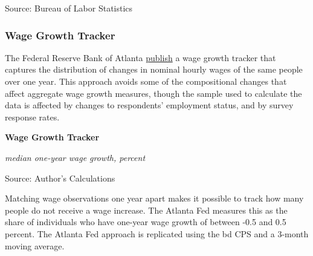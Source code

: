 \documentclass{report}
\makeatletter
\newcommand{\tbllink}[1]{\href{https://raw.githubusercontent.com/bdecon/US-chartbook/master/chartbook/data/#1}{\faTable}}
\newcommand*\short[1]{\expandafter\@gobbletwo\number\numexpr#1\relax}
\newcommand{\dateaxisticks}{
		date coordinates in=x, axis line style={draw=none},
		xmax={2020-10-01},
		max space between ticks=40,	    
		xtick={{1990-01-01}, {1992-01-01}, {1994-01-01}, 
			{1996-01-01}, {1998-01-01}, {2000-01-01}, 
			{2002-01-01}, {2004-01-01}, {2006-01-01},
			{2008-01-01}, {2010-01-01}, {2012-01-01}, {2014-01-01},
		    {2016-01-01}, {2018-01-01}, {2020-01-01}},
		minor xtick={{1989-01-01}, {1991-01-01}, {1993-01-01},
			{1995-01-01}, {1997-01-01}, {1999-01-01}, 
			{2001-01-01}, {2003-01-01}, {2005-01-01}, {2007-01-01},
		    {2009-01-01}, {2011-01-01}, {2013-01-01}, {2015-01-01},
		    {2017-01-01}, {2019-01-01}},
		enlarge y limits={0.06}, enlarge x limits={0.01},
		}
\newcommand{\bbar}[2]{extra #1 ticks = {{#2}}, extra #1 tick labels = ,
		extra #1 tick style = {grid=major, grid style={thick, black!25}},}
\newcommand{\stdline}[4]{\addplot[very thick, no markers, color=#1] 
		table [x=#2, y=#3, col sep=comma] {#4};	}
\newcommand{\thinline}[4]{\addplot[no markers, color=#1] 
		table [x=#2, y=#3, col sep=comma] {#4};	}
\newcommand{\rebars}{
		\fill[color=black!10] (axis cs:{2007-12-01},\pgfkeysvalueof{/pgfplots/ymin}) rectangle 
			(axis cs:{2009-07-01}, \pgfkeysvalueof{/pgfplots/ymax});
		\fill[color=black!10] (axis cs:{2001-03-01},\pgfkeysvalueof{/pgfplots/ymin}) rectangle 
			(axis cs:{2001-11-01}, \pgfkeysvalueof{/pgfplots/ymax});
		\fill[color=black!10] (axis cs:{2020-02-01},\pgfkeysvalueof{/pgfplots/ymin}) rectangle 
			(axis cs:{2020-10-01}, \pgfkeysvalueof{/pgfplots/ymax});}
\makeatother
\begin{document}
{{{{{{{{{\begin{minipage}{0.44\textwidth}
\footnotesize{Source: Bureau of Labor Statistics} \hfill \tbllink{eci.csv}
\end{minipage} \hspace{6mm} \begin{minipage}{0.27\textwidth}
\small 
\end{minipage}
\newpage
\subsubsection*{\color{black!70} \seriffont Wage Growth Tracker}
\begin{minipage}{0.76\textwidth}
\small The Federal Reserve Bank of Atlanta \href{https://www.frbatlanta.org/chcs/wage-growth-tracker}{publish} a wage growth tracker that captures the distribution of changes in nominal hourly wages of the same people over one year. This approach avoids some of the compositional changes that affect aggregate wage growth measures, though the sample used to calculate the data is affected by changes to respondents' employment status, and by survey response rates. \\



\vspace{6mm}

\normalsize \textbf{Wage Growth Tracker}

\footnotesize{\textit{median one-year wage growth, percent}}

\hspace*{-2mm} 

\footnotesize{Source: Author's Calculations} \hspace{59mm} \tbllink{atl_wgt.csv}

\vspace{16mm}

\small Matching wage observations one year apart makes it possible to track how many people do not receive a wage increase. The Atlanta Fed measures this as the share of individuals who have one-year wage growth of between -0.5 and 0.5 percent. The Atlanta Fed approach is replicated using the bd CPS and a 3-month moving average. 


\end{minipage}}}}}}}}}}
\end{document}
